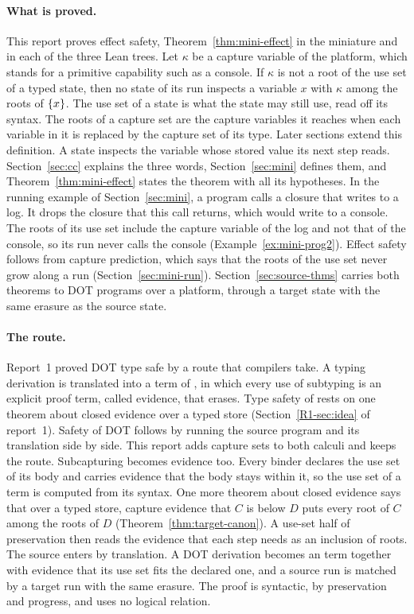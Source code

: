 \paragraph{What is proved.}
This report proves effect safety, Theorem~\ref{thm:mini-effect} in the miniature and  in each of the three Lean trees. Let $\kappa$ be a capture variable of the platform, which stands for a primitive capability such as a console. If $\kappa$ is not a root of the use set of a typed state, then no state of its run inspects a variable $x$ with $\kappa$ among the roots of $\{x\}$. The use set of a state is what the state may still use, read off its syntax. The roots of a capture set are the capture variables it reaches when each variable in it is replaced by the capture set of its type. Later sections extend this definition. A state inspects the variable whose stored value its next step reads. Section~\ref{sec:cc} explains the three words, Section~\ref{sec:mini} defines them, and Theorem~\ref{thm:mini-effect} states the theorem with all its hypotheses. In the running example of Section~\ref{sec:mini}, a program calls a closure that writes to a log. It drops the closure that this call returns, which would write to a console. The roots of its use set include the capture variable of the log and not that of the console, so its run never calls the console (Example~\ref{ex:mini-prog2}). Effect safety follows from capture prediction, which says that the roots of the use set never grow along a run (Section~\ref{sec:mini-run}). Section~\ref{sec:source-thms} carries both theorems to DOT programs over a platform, through a target state with the same erasure as the source state.

\paragraph{The route.}
Report~1 proved DOT type safe by a route that compilers take. A typing derivation is translated into a term of \FCdot, in which every use of subtyping is an explicit proof term, called evidence, that erases. Type safety of \FCdot rests on one theorem about closed evidence over a typed store (Section~\ref{R1-sec:idea} of report~1). Safety of DOT follows by running the source program and its translation side by side. This report adds capture sets to both calculi and keeps the route. Subcapturing becomes evidence too. Every binder declares the use set of its body and carries evidence that the body stays within it, so the use set of a term is computed from its syntax. One more theorem about closed evidence says that over a typed store, capture evidence that $C$ is below $D$ puts every root of $C$ among the roots of $D$ (Theorem~\ref{thm:target-canon}). A use-set half of preservation then reads the evidence that each step needs as an inclusion of roots. The source enters by translation. A DOT derivation becomes an \FCdot term together with evidence that its use set fits the declared one, and a source run is matched by a target run with the same erasure. The proof is syntactic, by preservation and progress, and uses no logical relation.

